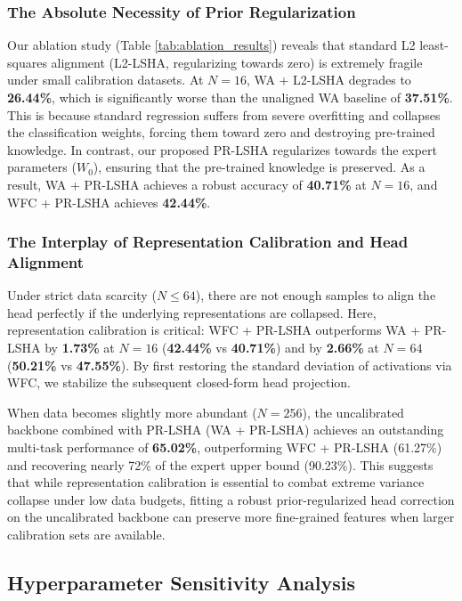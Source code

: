 \documentclass{article}
\theoremstyle{plain}
\theoremstyle{definition}
\theoremstyle{remark}
\begin{document}
\subsubsection{The Absolute Necessity of Prior Regularization}
\label{sec:prior_reg}
Our ablation study (Table \ref{tab:ablation_results}) reveals that standard L2 least-squares alignment (L2-LSHA, regularizing towards zero) is extremely fragile under small calibration datasets. At $N=16$, WA + L2-LSHA degrades to \textbf{26.44\%}, which is significantly worse than the unaligned WA baseline of \textbf{37.51\%}. This is because standard regression suffers from severe overfitting and collapses the classification weights, forcing them toward zero and destroying pre-trained knowledge. In contrast, our proposed PR-LSHA regularizes towards the expert parameters ($W_0$), ensuring that the pre-trained knowledge is preserved. As a result, WA + PR-LSHA achieves a robust accuracy of \textbf{40.71\%} at $N=16$, and WFC + PR-LSHA achieves \textbf{42.44\%}.

\subsubsection{The Interplay of Representation Calibration and Head Alignment}
\label{sec:interplay}
Under strict data scarcity ($N \le 64$), there are not enough samples to align the head perfectly if the underlying representations are collapsed. Here, representation calibration is critical: WFC + PR-LSHA outperforms WA + PR-LSHA by \textbf{1.73\%} at $N=16$ (\textbf{42.44\%} vs \textbf{40.71\%}) and by \textbf{2.66\%} at $N=64$ (\textbf{50.21\%} vs \textbf{47.55\%}). By first restoring the standard deviation of activations via WFC, we stabilize the subsequent closed-form head projection.

When data becomes slightly more abundant ($N=256$), the uncalibrated backbone combined with PR-LSHA (WA + PR-LSHA) achieves an outstanding multi-task performance of \textbf{65.02\%}, outperforming WFC + PR-LSHA (61.27\%) and recovering nearly 72\% of the expert upper bound (90.23\%). This suggests that while representation calibration is essential to combat extreme variance collapse under low data budgets, fitting a robust prior-regularized head correction on the uncalibrated backbone can preserve more fine-grained features when larger calibration sets are available.

\subsection{Hyperparameter Sensitivity Analysis}
\label{sec:sensitivity}
\end{document}
